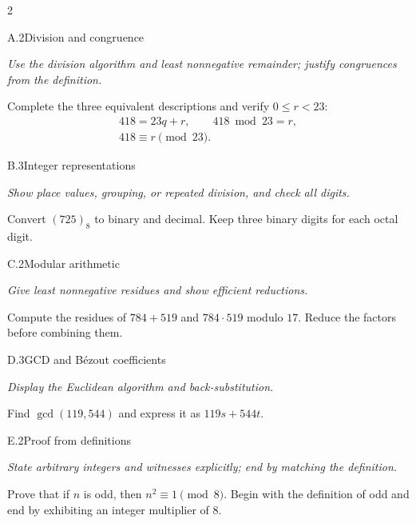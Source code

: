\documentclass[9pt]{extarticle}
\begin{document}
\begin{multicols}{2}
\begin{CoreProblem}{A.2}{Division and congruence}
{\scriptsize\textit{Use the division algorithm and least nonnegative remainder; justify congruences from the definition.}\par}
Complete the three equivalent descriptions and verify $0\le r<23$:
\[
\begin{gathered}
418=23q+r,\qquad 418\bmod 23=r,\\
418\equiv r\pmod{23}.
\end{gathered}
\]
\end{CoreProblem}
\begin{CoreProblem}{B.3}{Integer representations}
{\scriptsize\textit{Show place values, grouping, or repeated division, and check all digits.}\par}
Convert $(725)_8$ to binary and decimal. Keep three binary digits for each
octal digit.
\end{CoreProblem}
\begin{CoreProblem}{C.2}{Modular arithmetic}
{\scriptsize\textit{Give least nonnegative residues and show efficient reductions.}\par}
Compute the residues of $784+519$ and $784\cdot519$ modulo $17$. Reduce the
factors before combining them.
\end{CoreProblem}
\columnbreak
\begin{CoreProblem}{D.3}{GCD and B\'ezout coefficients}
{\scriptsize\textit{Display the Euclidean algorithm and back-substitution.}\par}
Find $\gcd(119,544)$ and express it as $119s+544t$.
\end{CoreProblem}
\begin{CoreProblem}{E.2}{Proof from definitions}
{\scriptsize\textit{State arbitrary integers and witnesses explicitly; end by matching the definition.}\par}
Prove that if $n$ is odd, then $n^2\equiv1\pmod{8}$. Begin with the definition
of odd and end by exhibiting an integer multiplier of $8$.
\end{CoreProblem}
\end{multicols}
\CoreWorkArea
\FormBreak
{}
\end{document}
